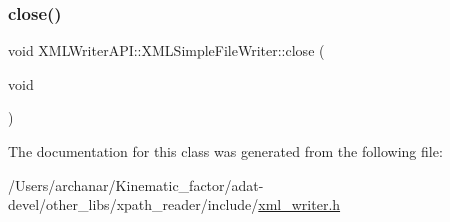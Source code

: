 \subsubsection{\texorpdfstring{close()}{close()}\hspace{0.1cm}{\footnotesize\ttfamily [3/3]}}
{\footnotesize\ttfamily void X\+M\+L\+Writer\+A\+P\+I\+::\+X\+M\+L\+Simple\+File\+Writer\+::close (\begin{DoxyParamCaption}\item[{void}]{ }\end{DoxyParamCaption})\hspace{0.3cm}{\ttfamily [inline]}}



The documentation for this class was generated from the following file\+:\begin{DoxyCompactItemize}
\item 
/\+Users/archanar/\+Kinematic\+\_\+factor/adat-\/devel/other\+\_\+libs/xpath\+\_\+reader/include/\mbox{\hyperlink{adat-devel_2other__libs_2xpath__reader_2include_2xml__writer_8h}{xml\+\_\+writer.\+h}}\end{DoxyCompactItemize}

